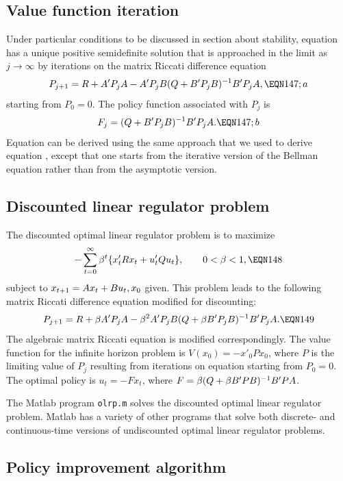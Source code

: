 \subsection{Value function iteration}
  Under particular conditions to be discussed in section  about  stability,
equation  has a unique positive
semidefinite solution that is approached in the limit as $j\to\infty$ by
iterations on the matrix Riccati difference equation
$$P_{j+1}=R+A'P_j A-A'P_jB(Q+B'P_jB)^{-1} B'P_jA,\EQN 147;a$$
starting from $P_0=0$.
The policy function  associated with $P_{j}$ is
$$F_{j} =(Q+B'P_j B)^{-1}B'P_j A. \EQN 147;b$$
 Equation  can be  derived using the same approach that we used to derive equation , 
except that one starts from the iterative version of the Bellman
equation  rather than from the asymptotic version.

\subsection{Discounted linear regulator problem}
The discounted optimal linear
regulator problem is to maximize
$$- \sum_{t=0}^\infty \be^t \{x'_t Rx_t+u'_tQu_t\},\qquad 0<\be<1,\EQN 148$$
subject to $x_{{t+1}}=Ax_t+Bu_t,x_0$ given. This problem
leads to the following matrix Riccati difference
equation modified for discounting:
$$P_{j+1} =R+\be A'P_jA-\be^2A'P_jB(Q+\be B'P_jB)^{-1} B'P_jA.\EQN 149$$
The algebraic matrix Riccati equation is modified correspondingly.  The value
function for the infinite horizon problem is  $V(x_0)= - x'_0Px_0$, where
$P$ is the limiting value of $P_j$ resulting from iterations on equation
 starting
from $P_0=0$.  The optimal policy is $u_t=-Fx_t$, where $F={\beta} (Q+{\beta}
B'PB)^{-1} B'PA$.

  The Matlab program {\tt olrp.m} solves the discounted
optimal linear regulator problem.  Matlab has a variety
of other programs that solve both discrete- and continuous-time
 versions of undiscounted
optimal linear regulator problems.
\subsection{Policy improvement algorithm}

